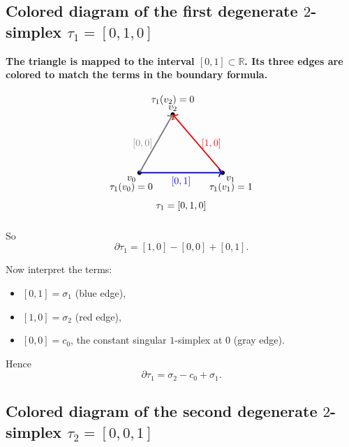 \documentclass[12pt,a4paper]{article}
\theoremstyle{notespace}
\begin{document}
\subsection{Colored diagram of the first degenerate \(2\)-simplex \(\tau_1=[0,1,0]\)}

\textbf{The triangle is mapped to the interval \([0,1]\subset \mathbb{R}\). Its three edges are colored to match the terms in the boundary formula.}

\[
\begin{tikzpicture}[scale=1.5]
	\coordinate (A) at (0,0);
	\coordinate (B) at (2,0);
	\coordinate (C) at (0.8,1.4);
	
	\draw[thick] (A)--(B)--(C)--cycle;
	
	\fill (A) circle (1.5pt) node[below left] {\(v_0\)};
	\fill (B) circle (1.5pt) node[below right] {\(v_1\)};
	\fill (C) circle (1.5pt) node[above] {\(v_2\)};
	
	\node at (-0.2,-0.35) {\(\tau_1(v_0)=0\)};
	\node at (2.2,-0.35) {\(\tau_1(v_1)=1\)};
	\node at (0.8,1.75) {\(\tau_1(v_2)=0\)};
	
	\draw[->, very thick, red] (B) -- (C) node[midway, right] {\([1,0]\)};
	\draw[->, very thick, gray] (A) -- (C) node[midway, left] {\([0,0]\)};
	\draw[->, very thick, blue] (A) -- (B) node[midway, below] {\([0,1]\)};
	
	\node at (1,-0.8) {\(\tau_1=[0,1,0]\)};
\end{tikzpicture}
\]

So
\[
\partial \tau_1 = [1,0]-[0,0]+[0,1].
\]

Now interpret the terms:

\begin{itemize}
	\item \([0,1]=\sigma_1\) (blue edge),
	\item \([1,0]=\sigma_2\) (red edge),
	\item \([0,0]=c_0\), the constant singular \(1\)-simplex at \(0\) (gray edge).
\end{itemize}

Hence
\[
\partial\tau_1=\sigma_2-c_0+\sigma_1.
\]

\subsection{Colored diagram of the second degenerate \(2\)-simplex \(\tau_2=[0,0,1]\)}
\end{document}
